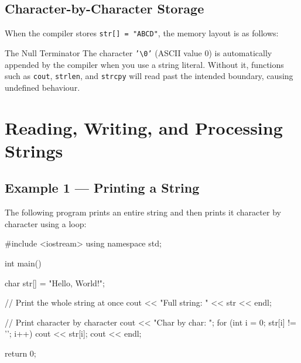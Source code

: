 \subsection{Character-by-Character Storage}

When the compiler stores \texttt{str[] = "ABCD"}, the memory layout is
as follows:

\begin{center}
\end{center}

\begin{importantbox}{The Null Terminator}
The character \texttt{'\textbackslash 0'} (ASCII value 0) is
automatically appended by the compiler when you use a string literal.
Without it, functions such as \texttt{cout}, \texttt{strlen}, and
\texttt{strcpy} will read past the intended boundary, causing
undefined behaviour.
\end{importantbox}

\section{Reading, Writing, and Processing Strings}
\label{sec:strings-rw}

\subsection{Example 1 --- Printing a String}

The following program prints an entire string and then prints it
character by character using a loop:

\begin{cppcode}
#include <iostream>
using namespace std;

int main() {
    char str[] = "Hello, World!";

    // Print the whole string at once
    cout << "Full string: " << str << endl;

    // Print character by character
    cout << "Char by char: ";
    for (int i = 0; str[i] != '\0'; i++) {
        cout << str[i];
    }
    cout << endl;

    return 0;
}
\end{cppcode}

